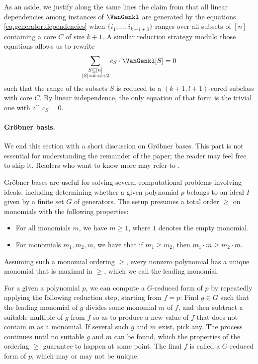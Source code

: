 \documentclass{toc}
\begin{document}
As an aside, we justify along the same lines the claim from   that all linear dependencies among instances of $\VanGenkl$ are generated by the equations \eqref{eq.generator.dependencies} when $\{i_1, \dots, i_{k+l+3}\}$ ranges over all subsets of $[n]$ containing a core $C$ of size $k+1$. A similar reduction strategy modulo those equations allows us to rewrite 
\[
\sum_{\substack{S \subseteq [n] \\ |S|=k+l+2}} c_S \cdot  \VanGenkl[S] = 0
\]
such that the range of the subsets $S$ is reduced to a $(k+1,l+1)$-cored subclass with core $C$. By linear independence, the only equation of that form is the trivial one with all $c_S=0$.

\paragraph{Gr\"obner basis.} We end this section with a short discussion on Gr\"obner bases. This part is not essential for understanding the remainder of the paper; the reader may feel free to skip it. Readers who want to know more may refer to \cite{AL1994,CLO2013}.

Gr\"obner bases are useful for solving several computational problems involving ideals, including determining whether a given polynomial $p$ belongs to an ideal $I$ given by a finite set $G$ of generators. The setup presumes a total order $\ge$ on monomials with the following properties:
\begin{itemize}
    \item For all monomials $m$, we have $m \ge 1$, where $1$ denotes the empty monomial.
    \item For monomials $m_1,m_2,m$, we have that if $m_1\ge m_2$, then $m_1\cdot m \ge m_2\cdot m$.
\end{itemize}
Assuming such a monomial ordering $\ge$, every nonzero polynomial has a unique monomial that is maximal in $\ge$, which we call the leading monomial. 

For a given a polynomial $p$, we can compute a $G$-reduced form of $p$ by repeatedly applying the following reduction step, starting from $f=p$: Find $g\in G$ such that the leading monomial of $g$ divides some monomial $m$ of $f$, and then subtract a suitable multiple of $g$ from $f$ so as to produce a new value of $f$ that does not contain $m$ as a monomial. If several such $g$ and $m$ exist, pick any. The process continues until no suitable $g$ and $m$ can be found, which the properties of the ordering $\ge$ guarantee to happen at some point. The final $f$ is called a $G$-reduced form of $p$, which may or may not be unique.
\end{document}
